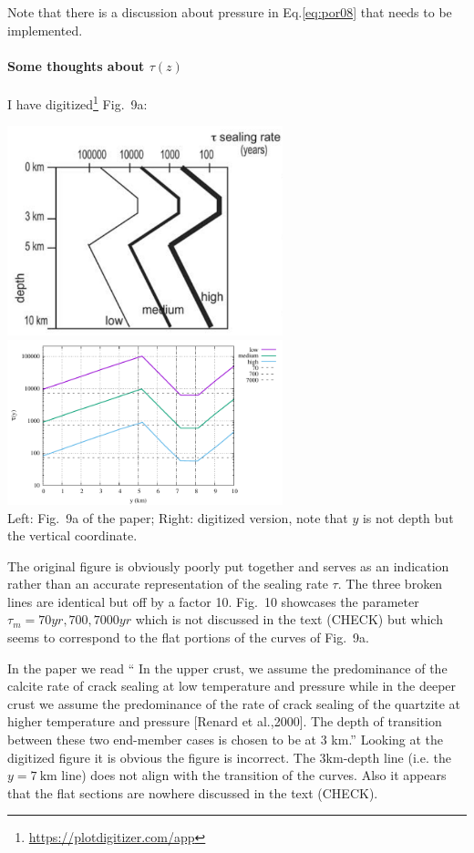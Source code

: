 Note that there is a discussion about pressure in Eq.\eqref{eq:por08} that needs to be implemented.

\paragraph{Some thoughts about $\tau(z)$}

I have digitized\footnote{\url{https://plotdigitizer.com/app}} Fig.~9a:
\begin{center}
\includegraphics[width=8cm]{python_codes/fieldstone_126/images/grfr03f}
\includegraphics[width=8cm]{python_codes/fieldstone_126/images/tau.pdf}\\
{\captionfont Left: Fig.~9a of the paper; Right: digitized version, note that $y$ is not depth but the
vertical coordinate.}
\end{center}
The original figure is obviously poorly put together and serves as an indication rather than 
an accurate representation of the sealing rate $\tau$.
The three broken lines are identical but off by a factor 10.  
Fig.~10 showcases the parameter $\tau_m=70yr,700,7000yr$ which is not discussed in the text (CHECK)
but which seems to correspond to the flat portions of the curves of Fig.~9a.

In the paper we read ``
In the upper crust, we assume the predominance of the calcite rate of crack sealing
at low temperature and pressure while in the deeper crust we
assume the predominance of the rate of crack sealing of the
quartzite at higher temperature and pressure [Renard et al.,2000]. 
The depth of transition between these two end-member cases is chosen to be at 3 km.''
Looking at the digitized figure it is obvious the figure is incorrect. The 3km-depth 
line (i.e. the $y=7~\si{\km}$ line) does not align with the transition of the curves.
Also it appears that  the flat sections are nowhere discussed in the text (CHECK).

